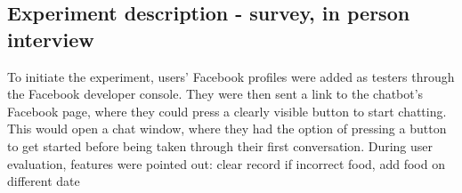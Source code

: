 \subsection{Experiment description - survey, in person interview}
To initiate the experiment, users' Facebook profiles were added as testers through the Facebook developer console. They were then sent a link to the chatbot's Facebook page, where they could press a clearly visible button to start chatting. This would open a chat window, where they had the option of pressing a button to get started before being taken through their first conversation.
During user evaluation, features were pointed out: clear record if incorrect food, add food on different date
